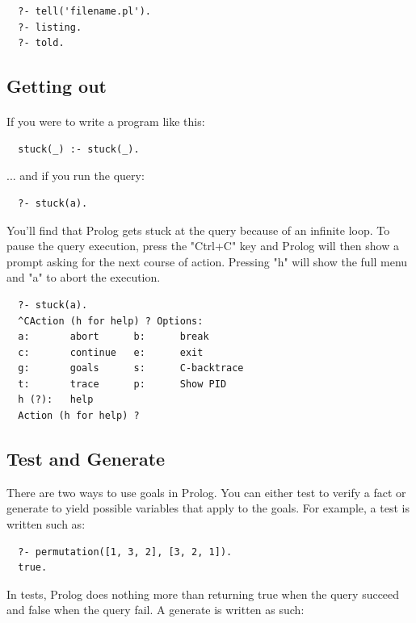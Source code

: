 \documentclass{article}
\begin{document}
\begin{multicols}{2}
  \begin{lstlisting}
  ?- tell('filename.pl').
  ?- listing.
  ?- told.
  \end{lstlisting}
  
  \subsection{Getting out}
  
  \paragraph{} If you were to write a program like this:
  
  \begin{lstlisting}
  stuck(_) :- stuck(_).
  \end{lstlisting}
  
  \noindent ... and if you run the query:
  
  \begin{lstlisting}
  ?- stuck(a).
  \end{lstlisting}
  
  \noindent You'll find that Prolog gets stuck at the query because of an infinite loop. To pause the query execution, press the "Ctrl+C" key and Prolog will then show a prompt asking for the next course of action. Pressing "h" will show the full menu and "a" to abort the execution.
  
  \begin{lstlisting}
  ?- stuck(a).
  ^CAction (h for help) ? Options:
  a:       abort      b:      break
  c:       continue   e:      exit
  g:       goals      s:      C-backtrace
  t:       trace      p:      Show PID
  h (?):   help
  Action (h for help) ? 
  \end{lstlisting}

  \subsection{Test and Generate}
  
  There are two ways to use goals in Prolog. You can either test to verify a fact or generate to yield possible variables that apply to the goals. For example, a test is written such as:
  
  \begin{lstlisting}
  ?- permutation([1, 3, 2], [3, 2, 1]).
  true.
  \end{lstlisting}
  
  In tests, Prolog does nothing more than returning true when the query succeed and false when the query fail. A generate is written as such:
  

\end{multicols}
\end{document}
